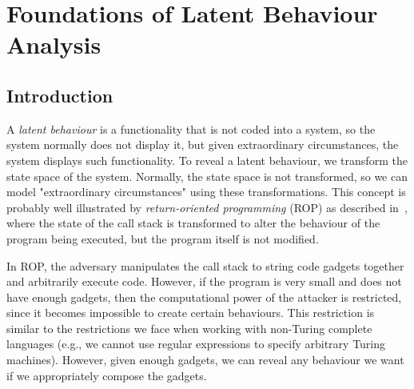 

\chapter{Foundations of Latent Behaviour Analysis} %
\label{ch:LatentBehaviours} %

\section{Introduction}
 
A \emph{latent behaviour} is a functionality that is not coded into a system, so the system normally does not display it, but given extraordinary circumstances, the system displays such functionality. To reveal a latent behaviour, we transform the state space of the system. Normally, the state space is not transformed, so we can model "extraordinary circumstances" using these transformations. This concept is probably well illustrated by \emph{return-oriented programming} (ROP) as described in~\cite{ROP}, where the state of the call stack is transformed to alter the behaviour of the program being executed, but the program itself is not modified.

In ROP, the adversary manipulates the call stack to string code gadgets together and arbitrarily execute code. However, if the program is very small and does not have enough gadgets, then the computational power of the attacker is restricted, since it becomes impossible to create certain behaviours. This restriction is similar to the restrictions we face when working with non-Turing complete languages (e.g., we cannot use regular expressions to specify arbitrary Turing machines). However, given enough gadgets, we can reveal any behaviour we want if we appropriately compose the gadgets.

